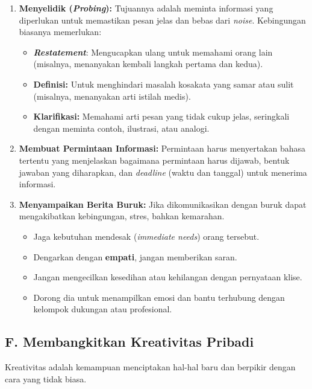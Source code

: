 \documentclass[
  letterpaper,
  DIV=11,
  numbers=noendperiod]{scrreprt}
\providecommand{\tightlist}{%
  \setlength{\itemsep}{0pt}\setlength{\parskip}{0pt}}
\begin{document}
\begin{enumerate}
\def\labelenumi{\arabic{enumi}.}
\tightlist
\item
  \textbf{Menyelidik (\emph{Probing}):} Tujuannya adalah meminta
  informasi yang diperlukan untuk memastikan pesan jelas dan bebas dari
  \emph{noise}. Kebingungan biasanya memerlukan:

  \begin{itemize}
  \tightlist
  \item
    \textbf{\emph{Restatement}}: Mengucapkan ulang untuk memahami orang
    lain (misalnya, menanyakan kembali langkah pertama dan kedua).
  \item
    \textbf{Definisi:} Untuk menghindari masalah kosakata yang samar
    atau sulit (misalnya, menanyakan arti istilah medis).
  \item
    \textbf{Klarifikasi:} Memahami arti pesan yang tidak cukup jelas,
    seringkali dengan meminta contoh, ilustrasi, atau analogi.
  \end{itemize}
\item
  \textbf{Membuat Permintaan Informasi:} Permintaan harus menyertakan
  bahasa tertentu yang menjelaskan bagaimana permintaan harus dijawab,
  bentuk jawaban yang diharapkan, dan \emph{deadline} (waktu dan
  tanggal) untuk menerima informasi.
\item
  \textbf{Menyampaikan Berita Buruk:} Jika dikomunikasikan dengan buruk
  dapat mengakibatkan kebingungan, stres, bahkan kemarahan.

  \begin{itemize}
  \tightlist
  \item
    Jaga kebutuhan mendesak (\emph{immediate needs}) orang tersebut.
  \item
    Dengarkan dengan \textbf{empati}, jangan memberikan saran.
  \item
    Jangan mengecilkan kesedihan atau kehilangan dengan pernyataan
    klise.
  \item
    Dorong dia untuk menampilkan emosi dan bantu terhubung dengan
    kelompok dukungan atau profesional.
  \end{itemize}
\end{enumerate}

\subsection{F. Membangkitkan Kreativitas
Pribadi}\label{f.-membangkitkan-kreativitas-pribadi}

Kreativitas adalah kemampuan menciptakan hal-hal baru dan berpikir
dengan cara yang tidak biasa.
\end{document}
